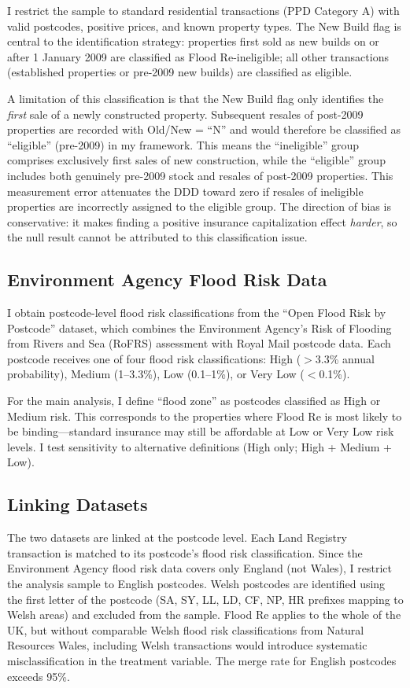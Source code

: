 \documentclass[12pt]{article}
\begin{document}
I restrict the sample to standard residential transactions (PPD Category A) with valid postcodes, positive prices, and known property types. The New Build flag is central to the identification strategy: properties first sold as new builds on or after 1 January 2009 are classified as Flood Re-ineligible; all other transactions (established properties or pre-2009 new builds) are classified as eligible.

A limitation of this classification is that the New Build flag only identifies the \textit{first} sale of a newly constructed property. Subsequent resales of post-2009 properties are recorded with Old/New = ``N'' and would therefore be classified as ``eligible'' (pre-2009) in my framework. This means the ``ineligible'' group comprises exclusively first sales of new construction, while the ``eligible'' group includes both genuinely pre-2009 stock and resales of post-2009 properties. This measurement error attenuates the DDD toward zero if resales of ineligible properties are incorrectly assigned to the eligible group. The direction of bias is conservative: it makes finding a positive insurance capitalization effect \textit{harder}, so the null result cannot be attributed to this classification issue.

\subsection{Environment Agency Flood Risk Data}

I obtain postcode-level flood risk classifications from the ``Open Flood Risk by Postcode'' dataset, which combines the Environment Agency's Risk of Flooding from Rivers and Sea (RoFRS) assessment with Royal Mail postcode data. Each postcode receives one of four flood risk classifications: High ($>$3.3\% annual probability), Medium (1--3.3\%), Low (0.1--1\%), or Very Low ($<$0.1\%).

For the main analysis, I define ``flood zone'' as postcodes classified as High or Medium risk. This corresponds to the properties where Flood Re is most likely to be binding---standard insurance may still be affordable at Low or Very Low risk levels. I test sensitivity to alternative definitions (High only; High + Medium + Low).

\subsection{Linking Datasets}

The two datasets are linked at the postcode level. Each Land Registry transaction is matched to its postcode's flood risk classification. Since the Environment Agency flood risk data covers only England (not Wales), I restrict the analysis sample to English postcodes. Welsh postcodes are identified using the first letter of the postcode (SA, SY, LL, LD, CF, NP, HR prefixes mapping to Welsh areas) and excluded from the sample. Flood Re applies to the whole of the UK, but without comparable Welsh flood risk classifications from Natural Resources Wales, including Welsh transactions would introduce systematic misclassification in the treatment variable. The merge rate for English postcodes exceeds 95\%.
\end{document}
